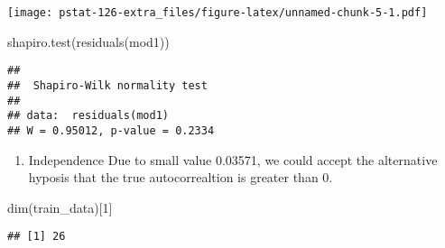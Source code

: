 \documentclass[
]{article}
\newenvironment{Shaded}{\begin{snugshade}}{\end{snugshade}}
\newcommand{\AttributeTok}[1]{\textcolor[rgb]{0.77,0.63,0.00}{#1}}
\newcommand{\DecValTok}[1]{\textcolor[rgb]{0.00,0.00,0.81}{#1}}
\newcommand{\FunctionTok}[1]{\textcolor[rgb]{0.00,0.00,0.00}{#1}}
\newcommand{\NormalTok}[1]{#1}
\newcommand{\OtherTok}[1]{\textcolor[rgb]{0.56,0.35,0.01}{#1}}
\newcommand{\SpecialCharTok}[1]{\textcolor[rgb]{0.00,0.00,0.00}{#1}}
\newcommand{\StringTok}[1]{\textcolor[rgb]{0.31,0.60,0.02}{#1}}
\providecommand{\tightlist}{%
  \setlength{\itemsep}{0pt}\setlength{\parskip}{0pt}}
\begin{document}
\texttt{[image: pstat-126-extra\_files/figure-latex/unnamed-chunk-5-1.pdf]}

\begin{Shaded}
\begin{Highlighting}[]
\FunctionTok{shapiro.test}\NormalTok{(}\FunctionTok{residuals}\NormalTok{(mod1))}
\end{Highlighting}
\end{Shaded}

\begin{verbatim}
## 
##  Shapiro-Wilk normality test
## 
## data:  residuals(mod1)
## W = 0.95012, p-value = 0.2334
\end{verbatim}

\begin{enumerate}
\def\labelenumi{(\alph{enumi})}
\setcounter{enumi}{2}
\tightlist
\item
  Independence Due to small value 0.03571, we could accept the
  alternative hyposis that the true autocorrealtion is greater than 0.
\end{enumerate}

\begin{Shaded}
\begin{Highlighting}[]
\FunctionTok{dim}\NormalTok{(train\_data)[}\DecValTok{1}\NormalTok{]}
\end{Highlighting}
\end{Shaded}

\begin{verbatim}
## [1] 26
\end{verbatim}

\begin{Shaded}
\end{Shaded}
\end{document}
